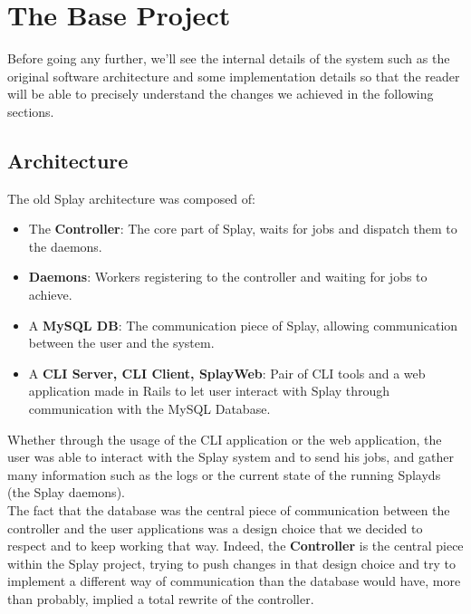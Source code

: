 \documentclass{eplmastersthesis}
\begin{document}
    \section{The Base Project}

      Before going any further, we'll see the internal details of the system
      such as the original software architecture and some implementation
      details so that the reader will be able to precisely understand the
      changes we achieved in the following sections.

      \subsection{Architecture}

        The old Splay architecture was composed of:

        \begin{itemize}
          \item The \textbf{Controller}: The core part of Splay, waits for jobs
          and dispatch them to the daemons.
          \item \textbf{Daemons}: Workers registering to the controller and waiting
          for jobs to achieve.
          \item A \textbf{MySQL DB}: The communication piece of Splay, allowing
          communication between the user and the system.
          \item A \textbf{CLI Server, CLI Client, SplayWeb}: Pair of CLI tools
          and a web application made in Rails to let user interact with
          Splay through communication with the MySQL Database.
        \end{itemize}

        Whether through the usage of the CLI application or the web application,
        the user was able to interact with the Splay system and to send his
        jobs, and gather many information such as the logs or the current
        state of the running Splayds (the Splay daemons).\\

        The fact that the database was the central piece of communication
        between the controller and the user applications was a design choice
        that we decided to respect and to keep working that way. Indeed, the
        \textbf{Controller} is the central piece within the Splay project,
        trying to push changes in that design choice and try to implement a
        different way of communication than the database would have, more
        than probably, implied a total rewrite of the controller.\\
\end{document}
